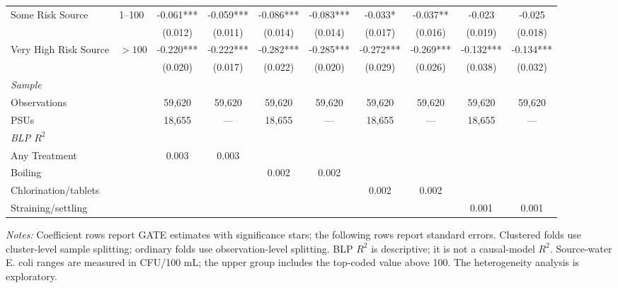 \begin{landscape}
\begin{table}[p]
\begin{adjustbox}{max width=\linewidth, center}
\begin{tabular}{llcccccccc}
Some Risk Source & 1--100 & -0.061*** & -0.059*** & -0.086*** & -0.083*** & -0.033* & -0.037** & -0.023 & -0.025 \\
 &  & (0.012) & (0.011) & (0.014) & (0.014) & (0.017) & (0.016) & (0.019) & (0.018) \\
Very High Risk Source & $>100$ & -0.220*** & -0.222*** & -0.282*** & -0.285*** & -0.272*** & -0.269*** & -0.132*** & -0.134*** \\
 &  & (0.020) & (0.017) & (0.022) & (0.020) & (0.029) & (0.026) & (0.038) & (0.032) \\
\multicolumn{10}{l}{\textit{Sample}} \\
\quad Observations &  & 59,620 & 59,620 & 59,620 & 59,620 & 59,620 & 59,620 & 59,620 & 59,620 \\
\quad PSUs &  & 18,655 & --- & 18,655 & --- & 18,655 & --- & 18,655 & --- \\
\multicolumn{10}{l}{\textit{BLP $R^{2}$}} \\
\quad Any Treatment &  & 0.003 & 0.003 &  &  &  &  &  &  \\
\quad Boiling &  &  &  & 0.002 & 0.002 &  &  &  &  \\
\quad Chlorination/tablets &  &  &  &  &  & 0.002 & 0.002 &  &  \\
\quad Straining/settling &  &  &  &  &  &  &  & 0.001 & 0.001 \\
\bottomrule
\end{tabular}
\end{adjustbox}
\par\vspace{3pt}
\begin{minipage}{\linewidth}\footnotesize \textit{Notes:} Coefficient rows report GATE estimates with significance stars; the following rows report standard errors. Clustered folds use cluster-level sample splitting; ordinary folds use observation-level splitting. BLP $R^2$ is descriptive; it is not a causal-model $R^2$. Source-water E. coli ranges are measured in CFU/100 mL; the upper group includes the top-coded value above 100. The heterogeneity analysis is exploratory.\end{minipage}
\end{table}
\end{landscape}